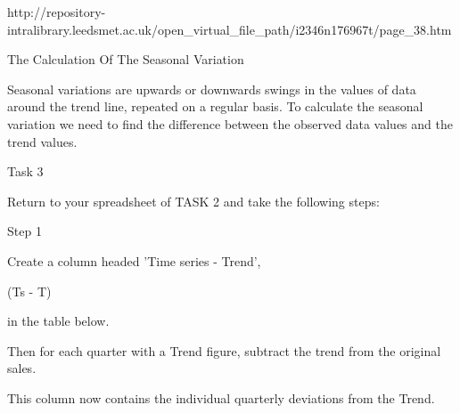 http://repository-intralibrary.leedsmet.ac.uk/open_virtual_file_path/i2346n176967t/page_38.htm

The Calculation Of The Seasonal Variation

Seasonal variations are upwards or downwards swings in the values of data around the trend line, repeated on a regular basis. To calculate the seasonal variation we need to find the difference between the observed data values and the trend values.

Task 3

Return to your spreadsheet of TASK 2 and take the following steps:

Step 1

Create a column headed 'Time series - Trend',

(Ts - T)

in the table below.

Then for each quarter with a Trend figure, subtract the trend from the original sales.

This column now contains the individual quarterly deviations from the Trend.
